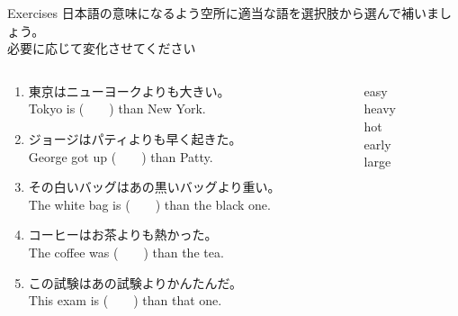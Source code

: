 \documentclass[aspectratio=169,xcolor={dvipsnames,table}]{beamer}
\begin{document}
\begin{frame}[plain]{Exercises}
 日本語の意味になるよう空所に適当な語を選択肢から選んで補いましょう。\\必要に応じて変化させてください%
\hfill{\scriptsize {}}

\begin{columns}[t]
 \begin{column}{.78\textwidth}
   \begin{enumerate}
  \item 東京はニューヨークよりも大きい。\\
	Tokyo is (~~~~) than New York. 
    \item ジョージはパティよりも早く起きた。\\
	George got up (~~~~) than Patty. 
    \item その白いバッグはあの黒いバッグより重い。\\
	The white bag is (~~~~) than the black one. 
    \item コーヒーはお茶よりも熱かった。\\
	The coffee was (~~~~) than the tea. 
    \item この試験はあの試験よりかんたんだ。\\
	This exam  is (~~~~) than that one. 
 \end{enumerate}
 \end{column}
\begin{column}{.2\textwidth}
 \begin{tcolorbox}
  easy\\
  heavy\\
  hot\\
  early\\
  large
 \end{tcolorbox}
\end{column}
\end{columns}
\end{frame}
\end{document}
